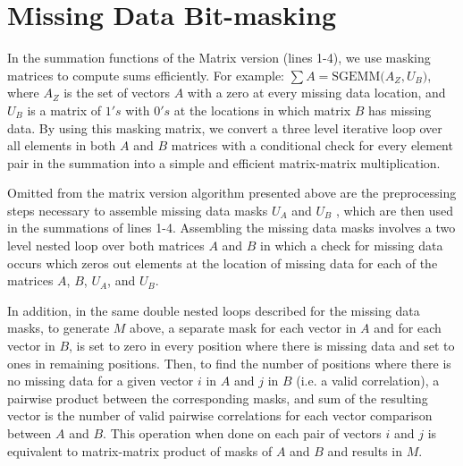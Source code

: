 \documentclass{bioinfo}
\begin{document}
\section{Missing Data Bit-masking} \label{MDBM}
In the summation functions of the Matrix version (lines 1-4), we use masking matrices to compute 
sums efficiently. For example: $\sum A=\text{SGEMM(}A_Z,U_B\text{)}$, where $A_Z$ is the set of 
vectors $A$ with a zero at every missing data location, and $U_B$ is a matrix of $1's$ with $0's$ 
at the locations in which matrix $B$ has missing data. By using this masking matrix, we convert a 
three level iterative loop over all elements in both $A$ and $B$ matrices with a conditional check 
for every element pair in the summation into a simple and efficient matrix-matrix multiplication.

Omitted from the matrix version algorithm presented above are the preprocessing steps necessary to 
assemble missing data masks $U_A$ and $U_B$ , which are then used in the summations of lines 1-4.
Assembling the missing data masks involves a two level nested loop over both matrices $A$ and $B$ in 
which a check for missing data occurs which zeros out elements at the location of missing data for 
each of the matrices $A$, $B$, $U_A$, and $U_B$.

In addition, in the same double nested loops described for the missing data masks, to 
generate $M$ above, a separate mask for each vector in $A$ and for each vector in $B$, 
is set to zero in every position where there is missing data and set to ones in remaining positions.
Then, to find the number of positions where there is no missing data for a given vector $i$ 
in $A$ and $j$ in $B$ (i.e. a valid correlation), a pairwise product between the corresponding masks, 
and sum of the resulting vector is the number of valid
pairwise correlations for each vector comparison between $A$ and $B$. This operation when done 
on each pair of vectors $i$ and $j$ is equivalent to matrix-matrix product of masks of 
$A$ and $B$ and results in $M$.
\end{document}
